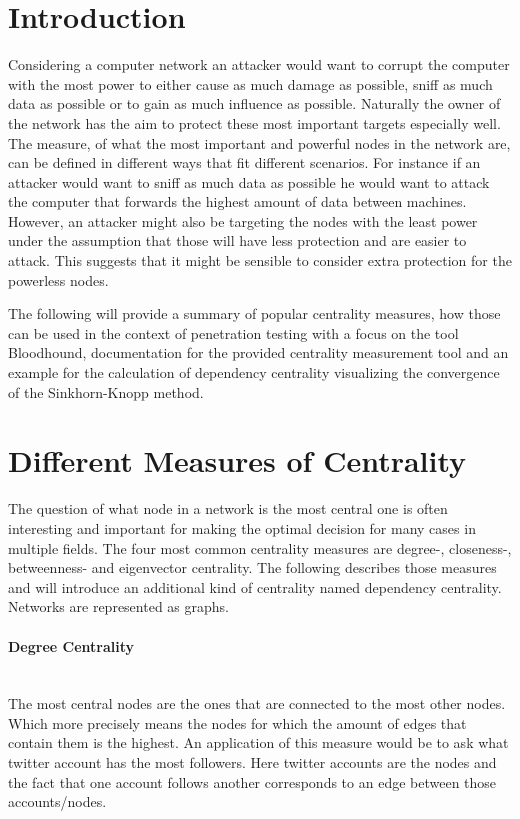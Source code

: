 \maketitle
\section{Introduction}

Considering a computer network an attacker would want to corrupt the computer with the
most power to either cause as much damage as possible, sniff as much data as possible or to
gain as much influence as possible. Naturally the owner of the network has the aim to protect
these most important targets especially well. The measure, of what the most important and 
powerful nodes in the network are, can be defined in different ways that fit different scenarios.
For instance if an attacker would want to sniff as much data as possible he would want to
attack the computer that forwards the highest amount of data between machines. However, an
attacker might also be targeting the nodes with the least power under the assumption that
those will have less protection and are easier to attack. This suggests that it might be
sensible to consider extra protection for the powerless nodes.

The following will provide a summary of popular centrality measures, how those can be used in
the context of penetration testing with a focus on the tool Bloodhound, documentation for the
provided centrality measurement tool and an example for the calculation of dependency
centrality visualizing the convergence of the Sinkhorn-Knopp method.

\section{Different Measures of Centrality}

The question of what node in a network is the most central one is often interesting
and important for making the optimal decision for many cases in multiple fields. 
The four most common centrality measures are degree-, closeness-, betweenness- and eigenvector 
centrality. The following describes those measures and will introduce an additional kind of 
centrality named dependency centrality. Networks are represented as graphs.

\paragraph{Degree Centrality}\mbox{} \medskip \\
The most central nodes are the ones that are connected to the most other nodes.
Which more precisely means the nodes for which the amount of edges that contain them is the highest. 
An application of this measure would be to ask what twitter account has the most followers.
Here twitter accounts are the nodes and the fact that one account follows another corresponds 
to an edge between those accounts/nodes.

